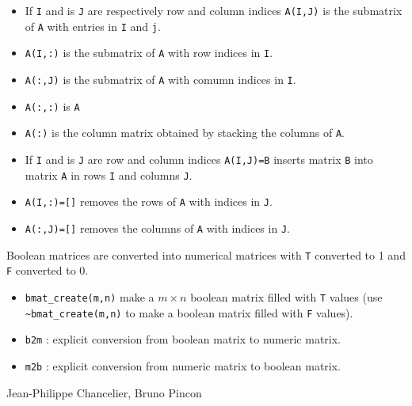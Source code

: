 \begin{itemize}
   \item If \verb+I+ and is \verb+J+ are respectively row and column indices \verb+A(I,J)+ is the submatrix of \verb+A+ with entries in \verb+I+ and \verb+j+.
   \item \verb+A(I,:)+ is the submatrix of \verb+A+ with row indices in \verb+I+.
   \item \verb+A(:,J)+ is the submatrix of \verb+A+ with comumn indices in \verb+I+.
   \item \verb+A(:,:)+ is \verb+A+
   \item \verb+A(:)+  is the column matrix obtained by stacking the columns of \verb+A+.
\end{itemize}
\begin{itemize}
   \item If \verb+I+ and is \verb+J+ are row and column indices \verb+A(I,J)=B+ inserts
matrix \verb+B+ into matrix \verb+A+ in rows \verb+I+ and columns \verb!J!.
   \item \verb+A(I,:)=[]+ removes the rows of \verb+A+ with indices in \verb+J+.
   \item \verb+A(:,J)=[]+ removes the columns of \verb+A+ with indices in \verb+J+.
\end{itemize}


Boolean matrices are converted into numerical matrices with \verb+T+ converted to 1 
and \verb+F+ converted to 0. 

\begin{itemize}
\item \verb+bmat_create(m,n)+ make a $m \times n$ boolean matrix filled with \verb+T+ values
  (use \verb+~bmat_create(m,n)+ to make a boolean matrix filled with \verb+F+ values).
\item \verb+b2m+ : explicit conversion from boolean matrix to numeric matrix.
\item \verb+m2b+ : explicit conversion from numeric matrix to boolean matrix.
\end{itemize}
\begin{manseealso}

\end{manseealso}

\begin{authors}
   Jean-Philippe Chancelier, Bruno Pincon
\end{authors}
